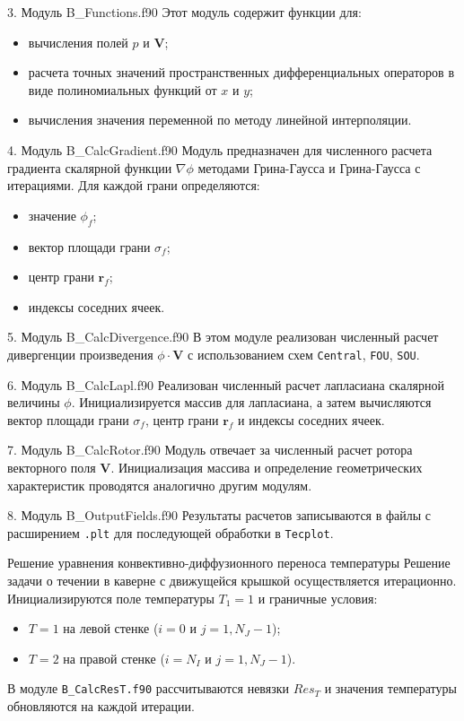 {3. Модуль B\_Functions.f90}
Этот модуль содержит функции для:
\begin{itemize}
    \item вычисления полей $p$ и $\mathbf{V}$;
    \item расчета точных значений пространственных дифференциальных операторов в виде полиномиальных функций от $x$ и $y$;
    \item вычисления значения переменной по методу линейной интерполяции.
\end{itemize}

{4. Модуль B\_CalcGradient.f90}
Модуль предназначен для численного расчета градиента скалярной функции $\nabla \phi$ методами Грина-Гаусса и Грина-Гаусса с итерациями. Для каждой грани определяются:
\begin{itemize}
    \item значение $\phi_f$;
    \item вектор площади грани $\sigma_f$;
    \item центр грани $\mathbf{r}_f$;
    \item индексы соседних ячеек.
\end{itemize}

{5. Модуль B\_CalcDivergence.f90}
В этом модуле реализован численный расчет дивергенции произведения $\phi \cdot \mathbf{V}$ с использованием схем \texttt{Central}, \texttt{FOU}, \texttt{SOU}.

{6. Модуль B\_CalcLapl.f90}
Реализован численный расчет лапласиана скалярной величины $\phi$. Инициализируется массив для лапласиана, а затем вычисляются вектор площади грани $\sigma_f$, центр грани $\mathbf{r}_f$ и индексы соседних ячеек.

{7. Модуль B\_CalcRotor.f90}
Модуль отвечает за численный расчет ротора векторного поля $\mathbf{V}$. Инициализация массива и определение геометрических характеристик проводятся аналогично другим модулям.

{8. Модуль B\_OutputFields.f90}
Результаты расчетов записываются в файлы с расширением \texttt{.plt} для последующей обработки в \texttt{Tecplot}.

{Решение уравнения конвективно-диффузионного переноса температуры}
Решение задачи о течении в каверне с движущейся крышкой осуществляется итерационно. Инициализируются поле температуры $T_1 = 1$ и граничные условия:
\begin{itemize}
    \item $T = 1$ на левой стенке ($i = 0$ и $j = 1, N_J - 1$);
    \item $T = 2$ на правой стенке ($i = N_I$ и $j = 1, N_J - 1$).
\end{itemize}
В модуле \texttt{B\_CalcResT.f90} рассчитываются невязки $Res_T$ и значения температуры обновляются на каждой итерации.

